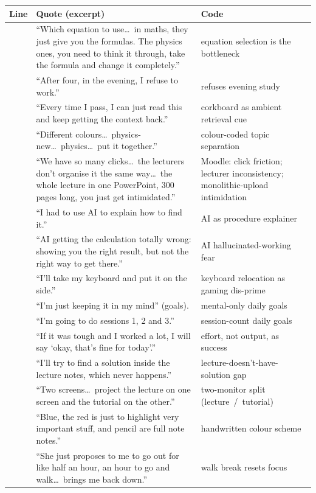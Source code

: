 \documentclass[a4paper,11pt]{article}
\begin{document}
\setlength{\emergencystretch}{3em}
\begin{longtable}{@{}>{\raggedright\arraybackslash}p{1.0cm}>{\raggedright\arraybackslash}p{8.4cm}>{\raggedright\arraybackslash}p{6.0cm}@{}}
\toprule
\textbf{Line} & \textbf{Quote (excerpt)} & \textbf{Code} \\
\midrule
\endhead
77      & ``Which equation to use\dots\ in maths, they just give you the formulas. The physics ones, you need to think it through, take the formula and change it completely.'' & equation selection is the bottleneck \\
109     & ``After four, in the evening, I refuse to work.'' & refuses evening study \\
133     & ``Every time I pass, I can just read this and keep getting the context back.'' & corkboard as ambient retrieval cue \\
137     & ``Different colours\dots\ physics-new\dots\ physics\dots\ put it together.'' & colour-coded topic separation \\
145     & ``We have so many clicks\dots\ the lecturers don't organise it the same way\dots\ the whole lecture in one PowerPoint, 300 pages long, you just get intimidated.'' & Moodle: click friction; lecturer inconsistency; monolithic-upload intimidation \\
161     & ``I had to use AI to explain how to find it.'' & AI as procedure explainer \\
169     & ``AI getting the calculation totally wrong: showing you the right result, but not the right way to get there.'' & AI hallucinated-working fear \\
205     & ``I'll take my keyboard and put it on the side.'' & keyboard relocation as gaming dis-prime \\
277     & ``I'm just keeping it in my mind'' (goals). & mental-only daily goals \\
281     & ``I'm going to do sessions 1, 2 and 3.'' & session-count daily goals \\
285     & ``If it was tough and I worked a lot, I will say `okay, that's fine for today'.'' & effort, not output, as success \\
311     & ``I'll try to find a solution inside the lecture notes, which never happens.'' & lecture-doesn't-have-solution gap \\
315     & ``Two screens\dots\ project the lecture on one screen and the tutorial on the other.'' & two-monitor split (lecture~/~tutorial) \\
329     & ``Blue, the red is just to highlight very important stuff, and pencil are full note notes.'' & handwritten colour scheme \\
347     & ``She just proposes to me to go out for like half an hour, an hour to go and walk\dots\ brings me back down.'' & walk break resets focus \\
\bottomrule
\end{longtable}
\end{document}
